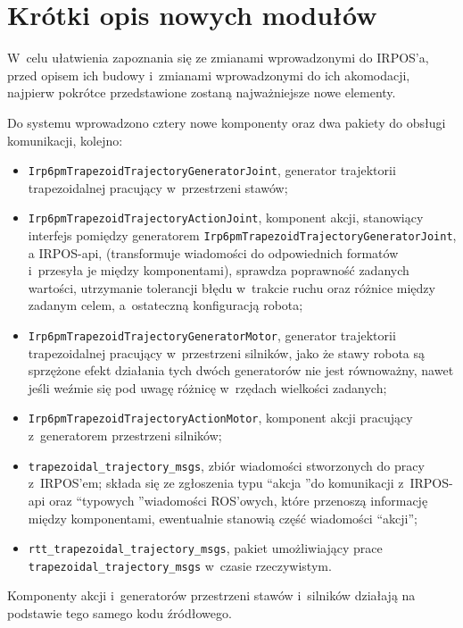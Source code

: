 \documentclass[a4paper, 12pt]{article}
\begin{document}
	\section{Krótki opis nowych modułów}
	\label{sec:shortMod}
	
	W~celu ułatwienia zapoznania się ze zmianami wprowadzonymi do IRPOS'a, przed opisem ich budowy i~zmianami wprowadzonymi do ich akomodacji, najpierw pokrótce przedstawione zostaną najważniejsze nowe elementy.
	\par 
	Do systemu wprowadzono cztery nowe komponenty oraz dwa pakiety do obsługi komunikacji, kolejno: 
		\begin{itemize}
		\item \texttt{Irp6pmTrapezoidTrajectoryGeneratorJoint}, generator trajektorii trapezoidalnej pracujący w~przestrzeni stawów;
		\item \texttt{Irp6pmTrapezoidTrajectoryActionJoint}, komponent akcji, stanowiący interfejs pomiędzy generatorem \texttt{Irp6pmTrapezoidTrajectoryGeneratorJoint}, a IRPOS-api, (transformuje wiadomości do odpowiednich formatów i~przesyła je między komponentami), sprawdza poprawność zadanych wartości, utrzymanie tolerancji błędu w~trakcie ruchu oraz różnice między zadanym celem, a~ostateczną konfiguracją robota;  
		\item \texttt{Irp6pmTrapezoidTrajectoryGeneratorMotor}, generator trajektorii trapezoidalnej pracujący w~przestrzeni silników, jako że stawy robota są sprzężone efekt działania tych dwóch generatorów nie jest równoważny, nawet jeśli weźmie się pod uwagę różnicę w~rzędach wielkości zadanych;
		\item \texttt{Irp6pmTrapezoidTrajectoryActionMotor}, komponent akcji pracujący z~generatorem przestrzeni silników; 
		\item \texttt{trapezoidal\_trajectory\_msgs}, zbiór wiadomości stworzonych do pracy z~IRPOS'em; składa się ze zgłoszenia typu \textquotedblleft akcja \textquotedblright do komunikacji z~IRPOS-api oraz \textquotedblleft typowych \textquotedblright wiadomości ROS'owych, które przenoszą informację między komponentami, ewentualnie stanowią część wiadomości \textquotedblleft akcji\textquotedblright;
		\item \texttt{rtt\_trapezoidal\_trajectory\_msgs}, pakiet umożliwiający prace \linebreak \texttt{trapezoidal\_trajectory\_msgs} w~czasie rzeczywistym.
		\end{itemize}
	Komponenty akcji i~generatorów przestrzeni stawów i~silników działają na podstawie tego samego kodu źródłowego. 
\end{document}
